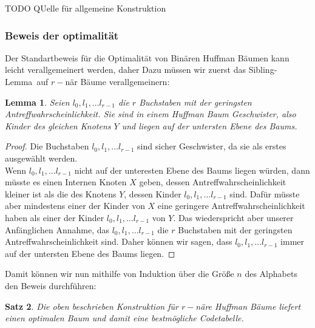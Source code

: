 \documentclass[a4paper,10pt,ngerman]{scrartcl}
\newtheorem{satz}{Satz}
\newtheorem{lemma}[satz]{Lemma}
\begin{document}
    TODO QUelle für allgemeine Konstruktion

    \subsubsection{Beweis der optimalität}
    Der Standartbeweis für die Optimalität von Binären Huffman Bäumen kann leicht verallgemeinert werden, daher
    Dazu müssen wir zuerst das \glqq Sibling-Lemma\grqq~auf $r-$när Bäume verallgemeinern: %
    \begin{lemma}
        Seien $l_0, l_1, \dots l_{r - 1}$ die $r$ Buchstaben mit der geringsten Antreffwahrscheinlichkeit. Sie sind in einem Huffman Baum \glqq Geschwister\grqq, also Kinder des gleichen Knotens $Y$ und liegen auf der untersten Ebene des Baums.
    \end{lemma}
    \begin{proof}
        Die Buchstaben $l_0, l_1, \dots l_{r - 1}$ sind sicher Geschwister, da sie als erstes ausgewählt werden. \\
        Wenn $l_0, l_1, \dots l_{r - 1}$ nicht auf der unteresten Ebene des Baums liegen würden, dann müsste es einen Internen Knoten $X$ geben, dessen Antreffwahrscheinlichkeit kleiner ist als die des Knotens $Y$, dessen Kinder $l_0, l_1, \dots l_{r - 1}$ sind. Dafür müsste aber mindestens einer der Kinder von $X$ eine geringere Antreffwahrscheinlichkeit haben als einer der Kinder  $l_0, l_1, \dots l_{r - 1}$ von $Y$. Das wiederspricht aber unserer Anfänglichen Annahme, das $l_0, l_1, \dots l_{r - 1}$ die $r$ Buchstaben mit der geringsten Antreffwahrscheinlichkeit sind. Daher können wir sagen, dass $l_0, l_1, \dots l_{r - 1}$ immer auf der untersten Ebene des Baums liegen.
    \end{proof}
    Damit können wir nun mithilfe von Induktion über die Größe $n$ des Alphabets den Beweis durchführen:
    \begin{satz}
        Die oben beschrieben Konstruktion für $r-$näre Huffman Bäume liefert einen optimalen Baum und damit eine bestmögliche Codetabelle.
    \end{satz}
\end{document}
